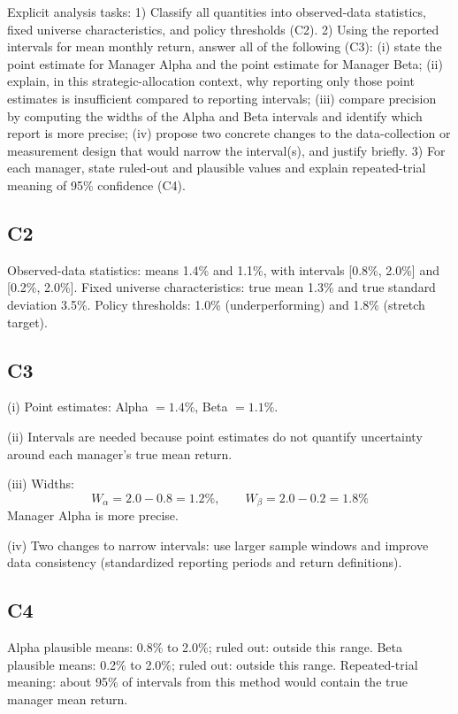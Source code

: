 \begin{ExamProblems}
		Explicit analysis tasks:
		1) Classify all quantities into observed-data statistics, fixed universe characteristics, and policy thresholds (C2).
		2) Using the reported intervals for mean monthly return, answer all of the following (C3): (i) state the point estimate for Manager Alpha and the point estimate for Manager Beta; (ii) explain, in this strategic-allocation context, why reporting only those point estimates is insufficient compared to reporting intervals; (iii) compare precision by computing the widths of the Alpha and Beta intervals and identify which report is more precise; (iv) propose two concrete changes to the data-collection or measurement design that would narrow the interval(s), and justify briefly.
		3) For each manager, state ruled-out and plausible values and explain repeated-trial meaning of 95\% confidence (C4).
		
		\subsection*{C2}
		Observed-data statistics: means 1.4\% and 1.1\%, with intervals [0.8\%, 2.0\%] and [0.2\%, 2.0\%].
		Fixed universe characteristics: true mean 1.3\% and true standard deviation 3.5\%.
		Policy thresholds: 1.0\% (underperforming) and 1.8\% (stretch target).
		
		\subsection*{C3}
		(i) Point estimates: Alpha $=1.4\%$, Beta $=1.1\%$.
		
		(ii) Intervals are needed because point estimates do not quantify uncertainty around each manager's true mean return.
		
		(iii) Widths:
		\[
		W_{\alpha}=2.0-0.8=1.2\%,\qquad W_{\beta}=2.0-0.2=1.8\%
		\]
		Manager Alpha is more precise.
		
		(iv) Two changes to narrow intervals: use larger sample windows and improve data consistency (standardized reporting periods and return definitions).
		
		\subsection*{C4}
		Alpha plausible means: 0.8\% to 2.0\%; ruled out: outside this range.
		Beta plausible means: 0.2\% to 2.0\%; ruled out: outside this range.
		Repeated-trial meaning: about 95\% of intervals from this method would contain the true manager mean return.
		

\end{ExamProblems}
